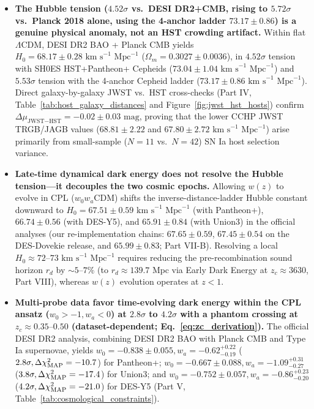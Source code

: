 \documentclass[11pt,letterpaper]{article}
\begin{document}
\begin{itemize}
    \setlength{\itemsep}{6pt}
    \item[\textcolor{tealaccent}{\textbullet}] \textbf{The Hubble tension ($4.52\sigma$ vs.\ DESI DR2+CMB, rising to $5.72\sigma$ vs.\ Planck 2018 alone, using the 4-anchor ladder $73.17 \pm 0.86$) is a genuine physical anomaly, not an HST crowding artifact.} Within flat $\Lambda$CDM, DESI DR2 BAO + Planck CMB yields $H_0 = 68.17 \pm 0.28\text{ km s}^{-1}\text{ Mpc}^{-1}$ ($\Omega_m = 0.3027 \pm 0.0036$), in $4.52\sigma$ tension with SH0ES HST+Pantheon+ Cepheids ($73.04 \pm 1.04\text{ km s}^{-1}\text{ Mpc}^{-1}$) and $5.53\sigma$ tension with the 4-anchor Cepheid ladder ($73.17 \pm 0.86\text{ km s}^{-1}\text{ Mpc}^{-1}$). Direct galaxy-by-galaxy JWST vs.\ HST cross-checks (Part IV, Table~\ref{tab:host_galaxy_distances} and Figure~\ref{fig:jwst_hst_hosts}) confirm $\Delta\mu_{\text{JWST}-\text{HST}} = -0.02 \pm 0.03\text{ mag}$, proving that the lower CCHP JWST TRGB/JAGB values ($68.81 \pm 2.22$ and $67.80 \pm 2.72\text{ km s}^{-1}\text{ Mpc}^{-1}$) arise primarily from small-sample ($N=11$ vs.\ $N=42$) SN Ia host selection variance.
    \item[\textcolor{tealaccent}{\textbullet}] \textbf{Late-time dynamical dark energy does not resolve the Hubble tension---it decouples the two cosmic epochs.} Allowing $w(z)$ to evolve in CPL ($w_0 w_a$CDM) shifts the inverse-distance-ladder Hubble constant downward to $H_0 = 67.51 \pm 0.59\text{ km s}^{-1}\text{ Mpc}^{-1}$ (with Pantheon+), $66.74 \pm 0.56$ (with DES-Y5), and $65.91 \pm 0.84$ (with Union3) in the official analyses (our re-implementation chains: $67.65 \pm 0.59$, $67.45 \pm 0.54$ on the DES-Dovekie release, and $65.99 \pm 0.83$; Part VII-B). Resolving a local $H_0 \approx 72\text{--}73\text{ km s}^{-1}\text{ Mpc}^{-1}$ requires reducing the pre-recombination sound horizon $r_d$ by $\sim 5\text{--}7\%$ (to $r_d \approx 139.7\text{ Mpc}$ via Early Dark Energy at $z_c \approx 3630$, Part VIII), whereas $w(z)$ evolution operates at $z < 1$.
    \item[\textcolor{tealaccent}{\textbullet}] \textbf{Multi-probe data favor time-evolving dark energy within the CPL ansatz ($w_0 > -1, w_a < 0$) at $2.8\sigma$ to $4.2\sigma$ with a phantom crossing at $z_c \approx 0.35\text{--}0.50$ (dataset-dependent; Eq.~\ref{eq:zc_derivation}).} The official DESI DR2 analysis, combining DESI DR2 BAO with Planck CMB and Type Ia supernovae, yields $w_0 = -0.838 \pm 0.055, w_a = -0.62^{+0.22}_{-0.19}$ ($2.8\sigma, \Delta\chi^2_{\rm MAP} = -10.7$) for Pantheon+; $w_0 = -0.667 \pm 0.088, w_a = -1.09^{+0.31}_{-0.27}$ ($3.8\sigma, \Delta\chi^2_{\rm MAP} = -17.4$) for Union3; and $w_0 = -0.752 \pm 0.057, w_a = -0.86^{+0.23}_{-0.20}$ ($4.2\sigma, \Delta\chi^2_{\rm MAP} = -21.0$) for DES-Y5 (Part V, Table~\ref{tab:cosmological_constraints}).

\end{itemize}
\end{document}
